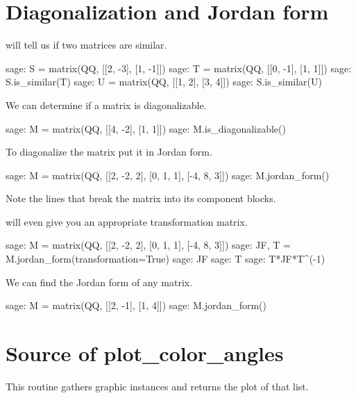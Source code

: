 \section{Diagonalization and Jordan form}

\Sage{} will tell us if two matrices are similar.
\begin{sagecommandline}
sage: S =  matrix(QQ, [[2, -3], [1, -1]]) 
sage: T =  matrix(QQ, [[0, -1], [1,  1]]) 
sage: S.is_similar(T)
sage: U =  matrix(QQ, [[1, 2], [3,  4]]) 
sage: S.is_similar(U)
\end{sagecommandline}
\noindent

We can determine if a matrix is diagonalizable.
\begin{sagecommandline}
sage: M =  matrix(QQ, [[4, -2], [1, 1]])  
sage: M.is_diagonalizable()
\end{sagecommandline}
\noindent
To diagonalize the matrix put it in Jordan form.
\begin{sagecommandline}
sage: M =  matrix(QQ, [[2, -2, 2], [0, 1, 1], [-4, 8, 3]])  
sage: M.jordan_form()
\end{sagecommandline}
\noindent 
Note the \inlinecode{-+-+-} lines that break the matrix into its component
blocks.

\Sage{} will even give you an appropriate transformation matrix.
\begin{sagecommandline}[d,0,1]
sage: M =  matrix(QQ, [[2, -2, 2], [0, 1, 1], [-4, 8, 3]])  
sage: JF, T = M.jordan_form(transformation=True)
sage: JF
sage: T
sage: T*JF*T^(-1)
\end{sagecommandline}

We can find the Jordan form of any matrix.
\begin{sagecommandline}
sage: M =  matrix(QQ, [[2, -1], [1, 4]])  
sage: M.jordan_form()
\end{sagecommandline}



\section{Source of plot\_color\_angles}
This routine gathers graphic instances and returns the plot of that list.


